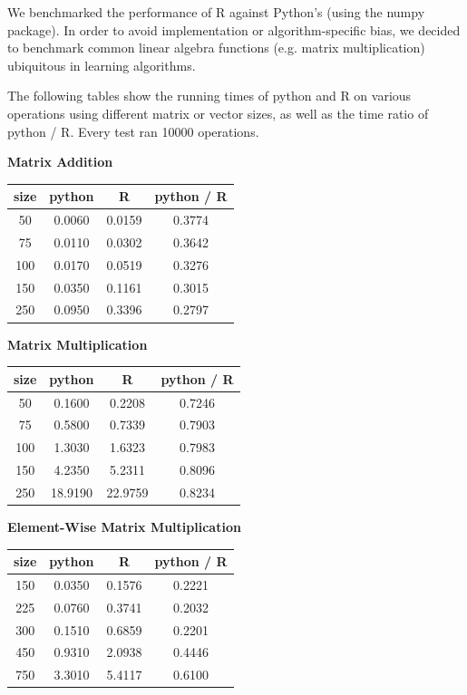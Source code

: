 \documentclass[%
        final,
        notitlepage,
        narroweqnarray,
        inline,
        ]{ieee}
\begin{document}
We benchmarked the performance of R against Python's (using the numpy package). In order to avoid implementation or algorithm-specific bias, we decided to benchmark common linear algebra functions (e.g. matrix multiplication) ubiquitous in learning algorithms.

The following tables show the running times of python and R on various operations using different matrix or vector sizes, as well as the time ratio of python / R. Every test ran 10000 operations.

\begin{center}
  \vspace{1em}
    \textbf{Matrix Addition} \\
\begin{tabular}{cccc}
size  & python  &  R       & python / R \\
  \hline
50  & 0.0060 & 0.0159 & 0.3774 \\
75  & 0.0110 & 0.0302 & 0.3642 \\
100 & 0.0170 & 0.0519 & 0.3276 \\
150 & 0.0350 & 0.1161 & 0.3015 \\
250 & 0.0950 & 0.3396 & 0.2797 \\
\hline
\end{tabular}

\vspace{1em}
    \textbf{Matrix Multiplication} \\
\begin{tabular}{cccc}
size  & python  &  R       & python / R \\
  \hline
50  & 0.1600  & 0.2208  & 0.7246 \\
75  & 0.5800  & 0.7339  & 0.7903 \\
100 & 1.3030  & 1.6323  & 0.7983 \\
150 & 4.2350  & 5.2311  & 0.8096 \\
250 & 18.9190 & 22.9759 & 0.8234 \\
\end{tabular}

\vspace{1em}
    \textbf{Element-Wise Matrix Multiplication} \\
\begin{tabular}{cccc}
size  & python  &  R       & python / R \\
  \hline
150   & 0.0350  &  0.1576  &  0.2221 \\
225   & 0.0760  &  0.3741  &  0.2032 \\
300   & 0.1510  &  0.6859  &  0.2201 \\
450   & 0.9310  &  2.0938  &  0.4446 \\
750   & 3.3010  &  5.4117  &  0.6100 \\
\end{tabular}


\end{center}
\end{document}
